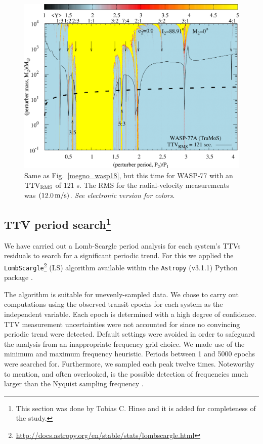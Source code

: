 \begin{figure}
\includegraphics[width=1.0\columnwidth]{imagenes/WASP77_TraMos_121sec_Map001_GIMP_scaled.png}
\caption{Same as Fig.~\ref{megno_wasp18}, but this time for WASP-77 with an $\rm TTV_{\rm RMS}$ of 121 s. The RMS for the radial-velocity measurements was $(12.0\,\rm m/s)$.
\emph{See electronic version for colors}.}
\label{megno_wasp77}
\end{figure}

\subsection{TTV period search\footnote{This section was done by Tobias C. Hinse and it is added for completeness of the study.}}

We have carried out a Lomb-Scargle period analysis \citep{Lomb1976, Scargle1982} for each system's TTVs residuals to search for a significant periodic trend. For this we applied the \texttt{LombScargle}\footnote{\url{http://docs.astropy.org/en/stable/stats/lombscargle.html}} (LS) algorithm available within the \texttt{Astropy} (v3.1.1) Python package \citep{2012cidu.conf...47V, 2015ApJ...812...18V}.

The algorithm is suitable for unevenly-sampled data. We chose to carry out computations using the observed transit epochs for each system as the independent variable. Each epoch is determined with a high degree of confidence. TTV measurement uncertainties were not accounted for since no convincing periodic trend were detected. Default settings were avoided in order to safeguard the analysis from an inappropriate frequency grid choice. We made use of the minimum and maximum frequency heuristic. Periods between 1 and 5000 epochs were searched for. Furthermore, we sampled each peak twelve times. Noteworthy to mention, and often overlooked, is the possible detection of frequencies much larger than the Nyquist sampling frequency \citep{2018ApJS..236...16V}. 


